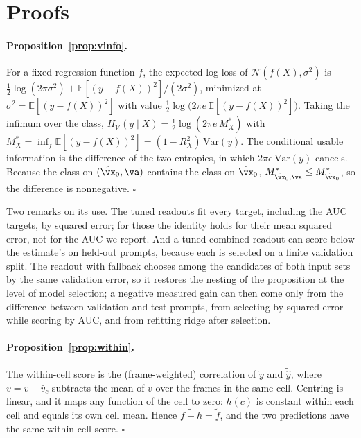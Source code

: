 \section{Proofs}
\label{app:proofs}

\paragraph{Proposition~\ref{prop:vinfo}.} For a fixed regression function $f$, the expected log loss of $\mathcal N(f(X), \sigma^2)$ is $\tfrac12 \log(2\pi\sigma^2) + \mathbb E[(y - f(X))^2]/(2\sigma^2)$, minimized at $\sigma^2 = \mathbb E[(y-f(X))^2]$ with value $\tfrac12 \log\big(2\pi e\, \mathbb E[(y-f(X))^2]\big)$. Taking the infimum over the class, $H_{\mathcal V}(y \mid X) = \tfrac12 \log(2\pi e\, M^*_X)$ with $M^*_X = \inf_f \mathbb E[(y - f(X))^2] = (1 - R^2_X)\,\mathrm{Var}(y)$. The conditional usable information is the difference of the two entropies, in which $2\pi e\,\mathrm{Var}(y)$ cancels. Because the class on $(\hat\vx_0, \va)$ contains the class on $\hat\vx_0$, $M^*_{\hat\vx_0, \va} \le M^*_{\hat\vx_0}$, so the difference is nonnegative. $\square$

Two remarks on its use. The tuned readouts fit every target, including the AUC targets, by squared error; for those the identity holds for their mean squared error, not for the AUC we report. And a tuned combined readout can score below the estimate's on held-out prompts, because each is selected on a finite validation split. The readout with fallback chooses among the candidates of both input sets by the same validation error, so it restores the nesting of the proposition at the level of model selection; a negative measured gain can then come only from the difference between validation and test prompts, from selecting by squared error while scoring by AUC, and from refitting ridge after selection.

\paragraph{Proposition~\ref{prop:within}.} The within-cell score is the (frame-weighted) correlation of $\tilde y$ and $\tilde{\hat y}$, where $\tilde v = v - \bar v_c$ subtracts the mean of $v$ over the frames in the same cell. Centring is linear, and it maps any function of the cell to zero: $h(c)$ is constant within each cell and equals its own cell mean. Hence $\widetilde{f + h} = \tilde f$, and the two predictions have the same within-cell score. $\square$

